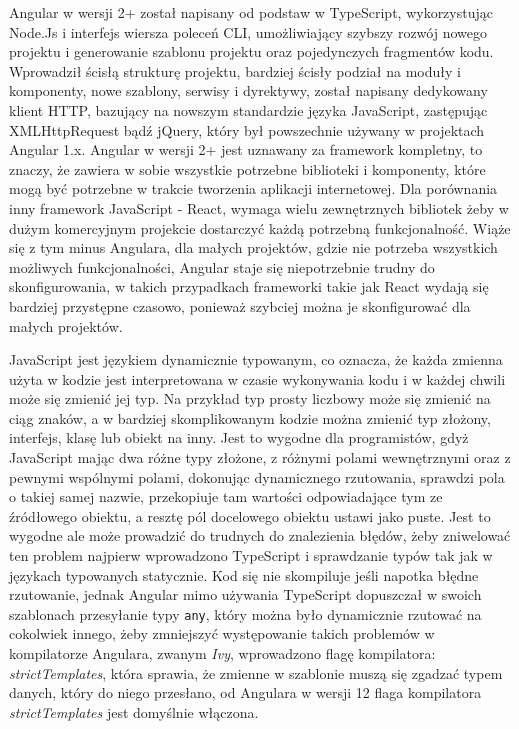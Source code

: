 \documentclass[12pt,a4paper,oneside]{book}
\begin{document}
Angular w wersji 2+ został napisany od podstaw w TypeScript, wykorzystując Node.Js i interfejs wiersza poleceń CLI, umożliwiający szybszy rozwój nowego projektu i generowanie szablonu projektu oraz pojedynczych fragmentów kodu. Wprowadził ścisłą strukturę projektu, bardziej ścisły podział na moduły i komponenty, nowe szablony, serwisy i dyrektywy, został napisany dedykowany klient HTTP, bazujący na nowszym standardzie języka JavaScript, zastępując XMLHttpRequest bądź jQuery, który był powszechnie używany w projektach Angular 1.x. Angular w wersji 2+ jest uznawany za framework kompletny, to znaczy, że zawiera w sobie wszystkie potrzebne biblioteki i komponenty, które mogą być potrzebne w trakcie tworzenia aplikacji internetowej. Dla porównania inny framework JavaScript - React, wymaga wielu zewnętrznych bibliotek żeby w dużym komercyjnym projekcie dostarczyć każdą potrzebną funkcjonalność. Wiąże się z tym minus Angulara, dla małych projektów, gdzie nie potrzeba wszystkich możliwych funkcjonalności, Angular staje się niepotrzebnie trudny do skonfigurowania, w takich przypadkach frameworki takie jak React wydają się bardziej przystępne czasowo, ponieważ szybciej można je skonfigurować dla małych projektów.

JavaScript jest językiem dynamicznie typowanym, co oznacza, że każda zmienna użyta w kodzie jest interpretowana w czasie wykonywania kodu i w każdej chwili może się zmienić jej typ. Na przykład typ prosty liczbowy może się zmienić na ciąg znaków, a w bardziej skomplikowanym kodzie można zmienić typ złożony, interfejs, klasę lub obiekt na inny. Jest to wygodne dla programistów, gdyż JavaScript mając dwa różne typy złożone, z różnymi polami wewnętrznymi oraz z pewnymi wspólnymi polami, dokonując dynamicznego rzutowania, sprawdzi pola o takiej samej nazwie, przekopiuje tam wartości odpowiadające tym ze źródłowego obiektu, a resztę pól  docelowego obiektu ustawi jako puste. Jest to wygodne ale może prowadzić do trudnych do znalezienia błędów, żeby zniwelować ten problem najpierw wprowadzono TypeScript i sprawdzanie typów tak jak w językach typowanych statycznie. Kod się nie skompiluje jeśli napotka błędne rzutowanie, jednak Angular mimo używania TypeScript dopuszczał w swoich szablonach przesyłanie typy \texttt{any}, który można było dynamicznie rzutować na cokolwiek innego, żeby zmniejszyć występowanie takich problemów w kompilatorze Angulara, zwanym \textit{Ivy}, wprowadzono flagę kompilatora: \textit{strictTemplates}, która sprawia, że zmienne w szablonie muszą się zgadzać typem danych, który do niego przesłano, od Angulara w wersji 12 flaga kompilatora \textit{strictTemplates} jest domyślnie włączona.
\end{document}
